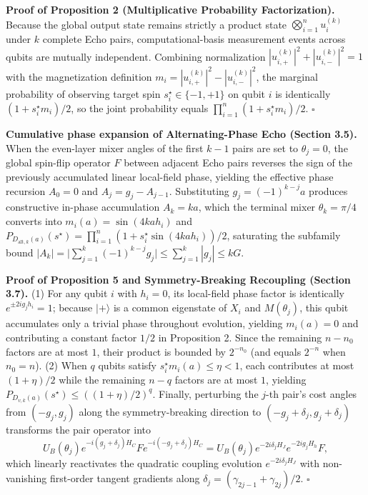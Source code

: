 \documentclass{article}
\theoremstyle{plain}
\theoremstyle{definition}
\begin{document}
\textbf{Proof of Proposition 2 (Multiplicative Probability Factorization).} Because the global output state remains strictly a product state $\bigotimes_{i=1}^n u_i^{(k)}$ under $k$ complete Echo pairs, computational-basis measurement events across qubits are mutually independent. Combining normalization $|u_{i,+}^{(k)}|^2+|u_{i,-}^{(k)}|^2=1$ with the magnetization definition $m_i=|u_{i,+}^{(k)}|^2-|u_{i,-}^{(k)}|^2$, the marginal probability of observing target spin $s_i^\star\in\{-1,+1\}$ on qubit $i$ is identically $(1+s_i^\star m_i)/2$, so the joint probability equals $\prod_{i=1}^n(1+s_i^\star m_i)/2$. \hfill$\square$

\textbf{Cumulative phase expansion of Alternating-Phase Echo (Section 3.5).} When the even-layer mixer angles of the first $k-1$ pairs are set to $\theta_j=0$, the global spin-flip operator $F$ between adjacent Echo pairs reverses the sign of the previously accumulated linear local-field phase, yielding the effective phase recursion $A_0=0$ and $A_j=g_j-A_{j-1}$. Substituting $g_j=(-1)^{k-j}a$ produces constructive in-phase accumulation $A_k=ka$, which the terminal mixer $\theta_k=\pi/4$ converts into $m_i(a)=\sin(4kah_i)$ and $P_{D_{\mathrm{alt},k}(a)}(s^\star)=\prod_{i=1}^n(1+s_i^\star\sin(4kah_i))/2$, saturating the subfamily bound $|A_k|=\big|\sum_{j=1}^k(-1)^{k-j}g_j\big|\le\sum_{j=1}^k|g_j|\le kG$.

\textbf{Proof of Proposition 5 and Symmetry-Breaking Recoupling (Section 3.7).} (1) For any qubit $i$ with $h_i=0$, its local-field phase factor is identically $e^{\pm 2ig_j h_i}=1$; because $|+\rangle$ is a common eigenstate of $X_i$ and $M(\theta_j)$, this qubit accumulates only a trivial phase throughout evolution, yielding $m_i(a)=0$ and contributing a constant factor $1/2$ in Proposition 2. Since the remaining $n-n_0$ factors are at most $1$, their product is bounded by $2^{-n_0}$ (and equals $2^{-n}$ when $n_0=n$). (2) When $q$ qubits satisfy $s_i^\star m_i(a)\le\eta<1$, each contributes at most $(1+\eta)/2$ while the remaining $n-q$ factors are at most $1$, yielding $P_{D_{v,k}(a)}(s^\star)\le((1+\eta)/2)^q$. Finally, perturbing the $j$-th pair's cost angles from $(-g_j, g_j)$ along the symmetry-breaking direction to $(-g_j+\delta_j, g_j+\delta_j)$ transforms the pair operator into
\[
U_B(\theta_j)e^{-i(g_j+\delta_j)H_C}Fe^{-i(-g_j+\delta_j)H_C}
=U_B(\theta_j)e^{-2i\delta_j H_J}e^{-2ig_j H_h}F,
\]
which linearly reactivates the quadratic coupling evolution $e^{-2i\delta_j H_J}$ with non-vanishing first-order tangent gradients along $\delta_j=(\gamma_{2j-1}+\gamma_{2j})/2$. \hfill$\square$
\end{document}
